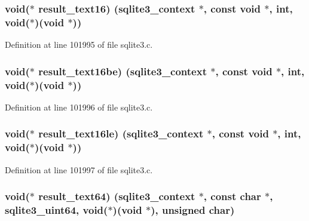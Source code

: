 \subsubsection[{result\+\_\+text16}]{\setlength{\rightskip}{0pt plus 5cm}void($\ast$ result\+\_\+text16) ({\bf sqlite3\+\_\+context} $\ast$, const void $\ast$, int, void($\ast$)(void $\ast$))}\label{structsqlite3__api__routines_ab1869eccf5949255f142c9f09709c8d9}


Definition at line 101995 of file sqlite3.\+c.

\hypertarget{structsqlite3__api__routines_acce9c11266b4572acd0994d313c77d37}{}
\subsubsection[{result\+\_\+text16be}]{\setlength{\rightskip}{0pt plus 5cm}void($\ast$ result\+\_\+text16be) ({\bf sqlite3\+\_\+context} $\ast$, const void $\ast$, int, void($\ast$)(void $\ast$))}\label{structsqlite3__api__routines_acce9c11266b4572acd0994d313c77d37}


Definition at line 101996 of file sqlite3.\+c.

\hypertarget{structsqlite3__api__routines_adc71601355bbd4236f52aafbe34843c8}{}
\subsubsection[{result\+\_\+text16le}]{\setlength{\rightskip}{0pt plus 5cm}void($\ast$ result\+\_\+text16le) ({\bf sqlite3\+\_\+context} $\ast$, const void $\ast$, int, void($\ast$)(void $\ast$))}\label{structsqlite3__api__routines_adc71601355bbd4236f52aafbe34843c8}


Definition at line 101997 of file sqlite3.\+c.

\hypertarget{structsqlite3__api__routines_ae7893880dc360bde005efb439340caca}{}
\subsubsection[{result\+\_\+text64}]{\setlength{\rightskip}{0pt plus 5cm}void($\ast$ result\+\_\+text64) ({\bf sqlite3\+\_\+context} $\ast$, const char $\ast$, {\bf sqlite3\+\_\+uint64}, void($\ast$)(void $\ast$), unsigned char)}\label{structsqlite3__api__routines_ae7893880dc360bde005efb439340caca}


